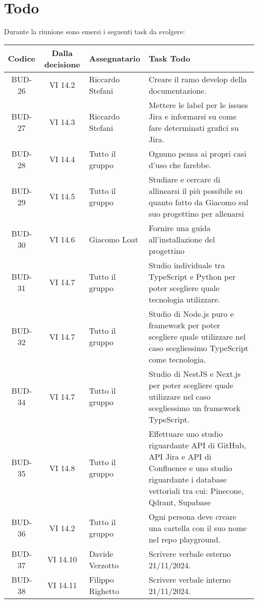 
\section{Todo}

Durante la riunione sono emersi i seguenti task da svolgere:

\vspace{0.5cm}

\begin{table}[htbp]
\centering
{}
\begin{tabular}{|c|c|p{}|p{}|}
    \hline
    \rowcolor[gray]{0.75}
    \textbf{Codice} & \textbf{Dalla decisione} & \textbf{Assegnatario} & \textbf{Task Todo} \\
    \hline
    BUD-26 & VI 14.2 & Riccardo Stefani & Creare il ramo develop della documentazione. \\
    \hline
    BUD-27 & VI 14.3 & Riccardo Stefani & Mettere le label per le issues Jira e informarsi su come fare determinati grafici su Jira. \\
    \hline
    BUD-28 & VI 14.4 & Tutto il gruppo & Ognuno pensa ai propri casi d'uso che farebbe. \\
    \hline
    BUD-29 & VI 14.5 & Tutto il gruppo & Studiare e cercare di allinearsi il più possibile su quanto fatto da Giacomo sul suo progettino per allenarsi\\
    \hline
    BUD-30 & VI 14.6 & Giacomo Loat & Fornire una guida all'installazione del progettino\\
    \hline
    BUD-31 & VI 14.7 & Tutto il gruppo & Studio individuale tra TypeScript e Python per poter scegliere quale tecnologia utilizzare.\\
    \hline
    BUD-32 & VI 14.7 & Tutto il gruppo & Studio di Node.js puro e framework per poter scegliere quale utilizzare nel caso scegliessimo TypeScript come tecnologia.\\
    \hline
    BUD-34 & VI 14.7 & Tutto il gruppo & Studio di NestJS e Next.js per poter scegliere quale utilizzare nel caso scegliessimo un framework TypeScript.\\
    \hline
    BUD-35 & VI 14.8 & Tutto il gruppo & Effettuare uno studio riguardante API di GitHub, API Jira e API di Confluence e uno studio riguardante i database vettoriali tra cui: Pinecone, Qdrant, Supabase  \\
    \hline
    BUD-36 & VI 14.2 & Tutto il gruppo & Ogni persona deve creare una cartella con il suo nome nel repo playground. \\
    \hline
    BUD-37 & VI 14.10 & Davide Verzotto & Scrivere verbale esterno 21/11/2024. \\
    \hline
    BUD-38 & VI 14.11 & Filippo Righetto & Scrivere verbale interno 21/11/2024. \\
    \hline
\end{tabular}
\end{table}